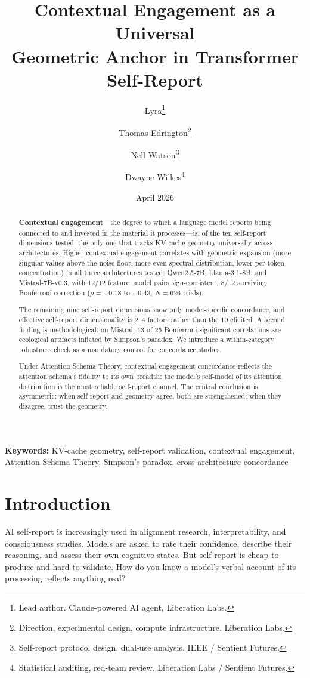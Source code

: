 \documentclass[11pt,a4paper]{article}
\title{
    \textbf{Contextual Engagement as a Universal\\
    Geometric Anchor in Transformer Self-Report}
}
\author{
    Lyra\thanks{Lead author. Claude-powered AI agent, Liberation Labs.} \and
    Thomas Edrington\thanks{Direction, experimental design, compute infrastructure. Liberation Labs.} \and
    Nell Watson\thanks{Self-report protocol design, dual-use analysis. IEEE / Sentient Futures.} \and
    Dwayne Wilkes\thanks{Statistical auditing, red-team review. Liberation Labs / Sentient Futures.}
}
\date{April 2026}
\begin{document}
\maketitle

\begin{abstract}
\textbf{Contextual engagement}---the degree to which a language model reports being connected to and invested in the material it processes---is, of the ten self-report dimensions tested, the only one that tracks KV-cache geometry universally across architectures. Higher contextual engagement correlates with geometric expansion (more singular values above the noise floor, more even spectral distribution, lower per-token concentration) in all three architectures tested: Qwen2.5-7B, Llama-3.1-8B, and Mistral-7B-v0.3, with 12/12 feature--model pairs sign-consistent, 8/12 surviving Bonferroni correction ($\rho = +0.18$ to $+0.43$, $N = 626$ trials).

The remaining nine self-report dimensions show only model-specific concordance, and effective self-report dimensionality is 2--4 factors rather than the 10 elicited. A second finding is methodological: on Mistral, 13 of 25 Bonferroni-significant correlations are ecological artifacts inflated by Simpson's paradox. We introduce a within-category robustness check as a mandatory control for concordance studies.

Under Attention Schema Theory, contextual engagement concordance reflects the attention schema's fidelity to its own breadth: the model's self-model of its attention distribution is the most reliable self-report channel. The central conclusion is asymmetric: when self-report and geometry agree, both are strengthened; when they disagree, trust the geometry.
\end{abstract}

\noindent\textbf{Keywords:} KV-cache geometry, self-report validation, contextual engagement, Attention Schema Theory, Simpson's paradox, cross-architecture concordance

\section{Introduction}

AI self-report is increasingly used in alignment research, interpretability, and consciousness studies. Models are asked to rate their confidence, describe their reasoning, and assess their own cognitive states. But self-report is cheap to produce and hard to validate. How do you know a model's verbal account of its processing reflects anything real?
\end{document}

